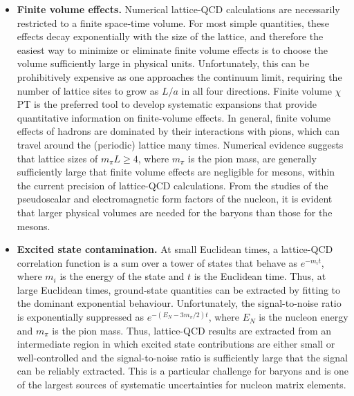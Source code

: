 \begin{itemize}
\item {\bfseries Finite volume effects.} Numerical lattice-QCD 
calculations are necessarily restricted to a finite space-time
volume.
%
For most simple quantities, these effects decay exponentially
with the size of the lattice, and therefore the easiest way to
minimize or eliminate finite volume effects is to choose the volume
sufficiently large in physical units.
%
Unfortunately, this can be
prohibitively expensive as one approaches the continuum limit, requiring the
number of lattice sites to grow as $L/a$ in all four directions. 
%
Finite volume $\chi$PT is the preferred
tool to develop systematic expansions that provide quantitative
information on finite-volume effects.
%
In general, finite volume
effects of hadrons are dominated by their interactions with pions,
which can travel around the (periodic) lattice many times.
%
Numerical
evidence suggests that lattice sizes of $m_\pi L \geq 4$, where
$m_\pi$ is the pion mass, are generally sufficiently large that finite
volume effects are negligible for mesons, within the current precision 
of lattice-QCD calculations.
%
From the studies of the pseudoscalar and electromagnetic form factors of the 
nucleon, it is evident that larger physical volumes are needed for the 
baryons than those for the mesons.

\item {\bfseries Excited state contamination.} 
At small Euclidean times, a lattice-QCD correlation function
is a sum over a tower of states that behave as $e^{-m_it}$, where $m_i$ is the 
energy of the state and $t$ is the Euclidean time. 
%
Thus, at large Euclidean times,
ground-state quantities can be extracted by fitting to the dominant 
exponential behaviour.
%
Unfortunately, the signal-to-noise ratio is exponentially suppressed 
as $e^{-(E_N-3m_\pi/2)t}$, where $E_N$ is the nucleon energy and $m_\pi$ is the 
pion mass.
%
Thus, lattice-QCD results
are extracted from an intermediate region in which excited state contributions 
are either small or well-controlled and the signal-to-noise ratio is 
sufficiently large that the signal can be reliably extracted. 
%
This is a particular challenge for baryons and is one of the largest 
sources of systematic uncertainties for nucleon matrix elements.


\end{itemize}
